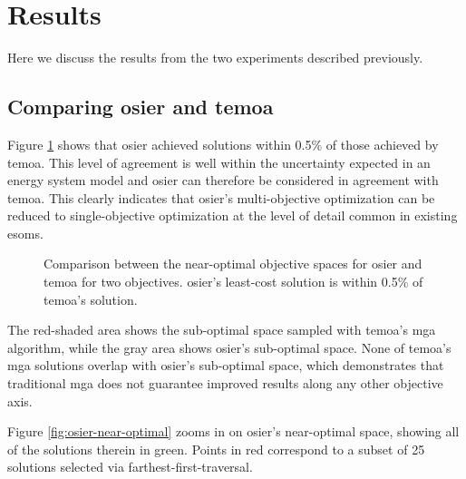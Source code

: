 \section{Results}

Here we discuss the results from the two experiments described previously.

\subsection{Comparing \gls{osier} and \gls{temoa}}

Figure \ref{fig:osier-temoa-benchmark} shows that \gls{osier} achieved solutions
within 0.5\%  of those achieved by \gls{temoa}. This level of agreement is well
within the uncertainty expected in an energy system model and \gls{osier} can
therefore be considered in agreement with \gls{temoa}. This clearly indicates
that \gls{osier}'s multi-objective optimization can be reduced to
single-objective optimization at the level of detail common in existing
\glspl{esom}.

\begin{figure}[ht!]
    \begin{center}
        \resizebox{\columnwidth}{!}{}
        \caption{Comparison between the near-optimal objective spaces for \gls{osier} and
        \gls{temoa} for two objectives. \gls{osier}'s least-cost solution is
        within 0.5\% of \gls{temoa}'s solution.}
        \label{fig:osier-temoa-benchmark}
    \end{center}
\end{figure}

The red-shaded area shows the sub-optimal space sampled with \gls{temoa}'s
\gls{mga} algorithm, while the gray area shows \gls{osier}'s sub-optimal space.
None of \gls{temoa}'s \gls{mga} solutions overlap with \gls{osier}'s sub-optimal
space, which demonstrates that traditional \gls{mga} does not guarantee improved
results along any other objective axis. 

Figure \ref{fig:osier-near-optimal} zooms in on \gls{osier}'s near-optimal
space, showing all of the solutions therein in green. Points in red correspond to
a subset of 25 solutions selected via farthest-first-traversal.

